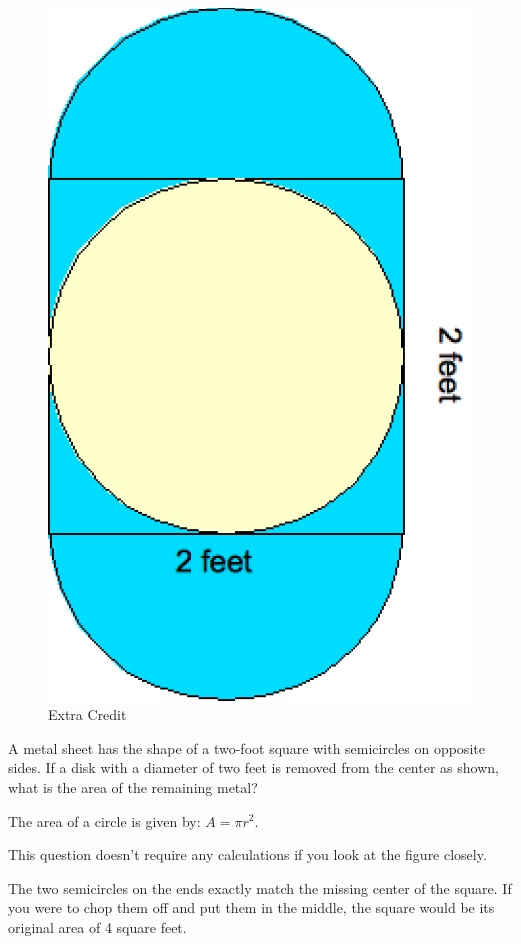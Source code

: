 \documentclass[fleqn,addpoints]{exam}
\begin{document}
\begin{questions}
\ifprintanswers
\else
\question[5]
\begin{figure}[h]
  \centering
  \includegraphics*{extra-credit.eps}  
  \caption{Extra Credit}
  \label{fig:extra-credit}
\end{figure}
\fi

A metal sheet has the shape of a two-foot square with semicircles on opposite sides.  If a disk with a diameter of two
feet is removed from the center as shown, what is the area of the remaining metal?

The area of a circle is given by: \(A = \pi r^2 \).

\begin{solution}[5 cm]

This question doesn't require any calculations if you look at the figure closely.  

The two semicircles on the ends exactly match the missing center of the square.  If you were to chop them off and put
them in the middle, the square would be its original area of 4 square feet.


\end{solution}
\end{questions}
\end{document}
